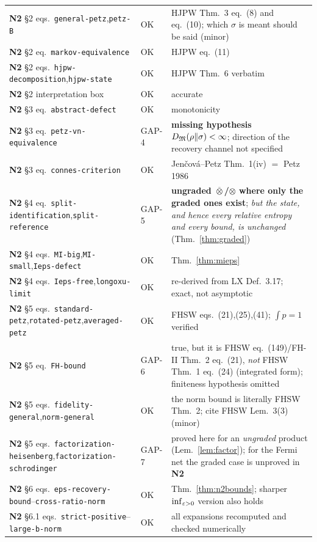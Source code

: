 \documentclass[11pt]{article}
\newcommand{\NII}{\textbf{N2}}
\newcommand{\loc}[1]{{\small\texttt{#1}}}
\newcommand{\1}{\mathbf 1}
\begin{document}
\begin{center}
\begin{longtable}{@{}p{}p{}p{}@{}}
\NII{} \S2 eqs.~\loc{general-petz},\loc{petz-B} & OK & HJPW Thm.~3 eq.~(8) and eq.~(10); which $\sigma$ is meant should be said (minor)\\
\NII{} \S2 eq.~\loc{markov-equivalence} & OK & HJPW eq.~(11)\\
\NII{} \S2 eqs.~\loc{hjpw-decomposition},\loc{hjpw-state} & OK & HJPW Thm.~6 verbatim\\
\NII{} \S2 interpretation box & OK & accurate\\
\NII{} \S3 eq.~\loc{abstract-defect} & OK & monotonicity\\
\NII{} \S3 eq.~\loc{petz-vn-equivalence} & GAP-4 & \textbf{missing hypothesis $D_{\mathfrak M}(\rho\|\sigma)<\infty$}; direction of the recovery channel not specified\\
\NII{} \S3 eq.~\loc{connes-criterion} & OK & Jen\v{c}ov\'a--Petz Thm.~1(iv) $=$ Petz 1986\\
\NII{} \S4 eq.~\loc{split-identification},\loc{split-reference} & GAP-5 & \textbf{ungraded $\overline\otimes$/$\otimes$ where only the graded ones exist}; \emph{but the state, and hence every relative entropy and every bound, is unchanged} (Thm.~\ref{thm:graded})\\
\NII{} \S4 eqs.~\loc{MI-big},\loc{MI-small},\loc{Ieps-defect} & OK & Thm.~\ref{thm:mieps}\\
\NII{} \S4 eqs.~\loc{Ieps-free},\loc{longoxu-limit} & OK & re-derived from LX Def.~3.17; exact, not asymptotic\\
\NII{} \S5 eqs.~\loc{standard-petz},\loc{rotated-petz},\loc{averaged-petz} & OK & FHSW eqs.~(21),(25),(41); $\int p=1$ verified\\
\NII{} \S5 eq.~\loc{FH-bound} & GAP-6 & true, but it is FHSW eq.~(149)/FH-II Thm.~2 eq.~(21), \emph{not} FHSW Thm.~1 eq.~(24) (integrated form); finiteness hypothesis omitted\\
\NII{} \S5 eqs.~\loc{fidelity-general},\loc{norm-general} & OK & the norm bound is literally FHSW Thm.~2; cite FHSW Lem.~3(3) (minor)\\
\NII{} \S5 eqs.~\loc{factorization-heisenberg},\loc{factorization-schrodinger} & GAP-7 & proved here for an \emph{ungraded} product (Lem.~\ref{lem:factor}); for the Fermi net the graded case is unproved in \NII\\
\NII{} \S6 eqs.~\loc{eps-recovery-bound}--\loc{cross-ratio-norm} & OK & Thm.~\ref{thm:n2bounds}; sharper $\inf_{\varepsilon>0}$ version also holds\\
\NII{} \S6.1 eqs.~\loc{strict-positive}--\loc{large-b-norm} & OK & all expansions recomputed and checked numerically\\

\end{longtable}
\end{center}
\end{document}
